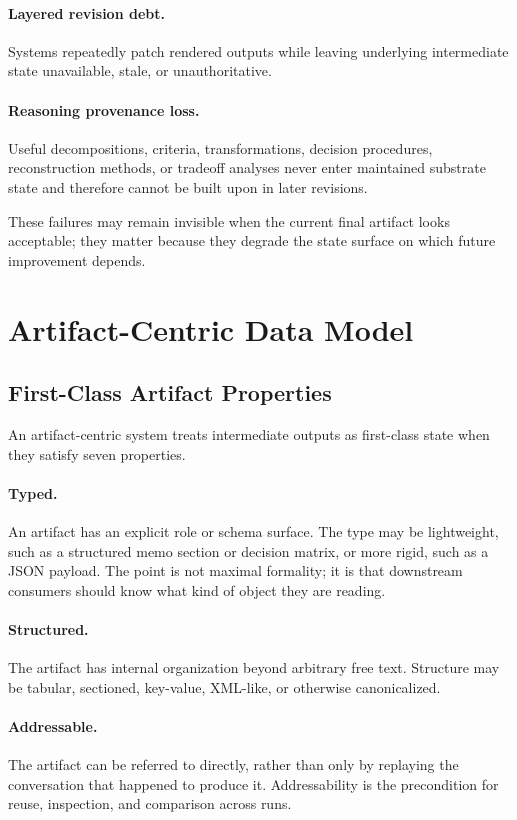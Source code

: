 \documentclass{article}
\begin{document}
\paragraph{Layered revision debt.} Systems repeatedly patch rendered outputs while leaving underlying intermediate state unavailable, stale, or unauthoritative.

\paragraph{Reasoning provenance loss.} Useful decompositions, criteria, transformations, decision procedures, reconstruction methods, or tradeoff analyses never enter maintained substrate state and therefore cannot be built upon in later revisions.

These failures may remain invisible when the current final artifact looks acceptable; they matter because they degrade the state surface on which future improvement depends.

\section{Artifact-Centric Data Model}

\subsection{First-Class Artifact Properties}

An artifact-centric system treats intermediate outputs as first-class state when they satisfy seven properties.

\paragraph{Typed.} An artifact has an explicit role or schema surface. The type may be lightweight, such as a structured memo section or decision matrix, or more rigid, such as a JSON payload. The point is not maximal formality; it is that downstream consumers should know what kind of object they are reading.

\paragraph{Structured.} The artifact has internal organization beyond arbitrary free text. Structure may be tabular, sectioned, key-value, XML-like, or otherwise canonicalized.

\paragraph{Addressable.} The artifact can be referred to directly, rather than only by replaying the conversation that happened to produce it. Addressability is the precondition for reuse, inspection, and comparison across runs.
\end{document}
